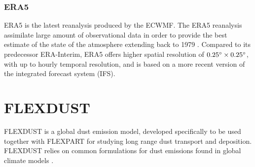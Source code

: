 \subsubsection{ERA5}
ERA5 is the latest reanalysis produced by the ECWMF. 
The ERA5 reanalysis assimilate large amount of observational data in order to provide the best estimate of the state of the atmosphere extending back to 1979 \parencite{hersbach_era5_2020}. Compared to its predecessor ERA-Interim, ERA5 offers higher spatial resolution of $0.25\degree \times 0.25\degree$, with up to hourly temporal resolution, and is based on a more recent version of the integrated forecast system (IFS). 

\section{FLEXDUST}
FLEXDUST is a global dust emission model, developed specifically to be used together 
with FLEXPART for studying long range dust transport and deposition. FLEXDUST relies on common 
formulations for dust emissions found in global climate models \parencite{flexdust_ref_2016}. 

